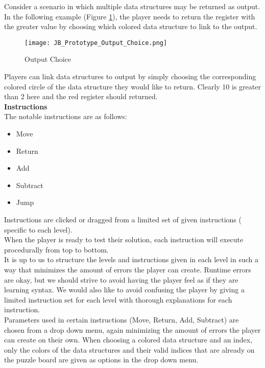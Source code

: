 Consider a scenario in which multiple data structures may be returned as output.
In the following example (Figure \ref{fig:Output_Choice}), the player needs to return the register
with the greater value by choosing which colored data structure to link to the output.

\begin{figure}[!hb]
  \caption{Output Choice}
  \label{fig:Output_Choice}
  \centering
  \texttt{[image: JB\_Prototype\_Output\_Choice.png]}
\end{figure}

Players can link data structures to output by simply choosing the corresponding colored
circle of the data structure they would like to return. Clearly 10 is greater than 2 here and
the red register should returned.\\

\textbf{Instructions}\\

The notable instructions are as follows:

\begin{itemize}
  \item Move
  \item Return
  \item Add
  \item Subtract
  \item Jump
\end{itemize}

Instructions are clicked or dragged from a limited set of given instructions (
specific to each level).\\

When the player is ready to test their solution, each instruction will execute
procedurally from top to bottom.\\

It is up to us to structure the levels and instructions given in each level in such
a way that minimizes the amount of errors the player can create. Runtime errors
are okay, but we should strive to avoid having the player feel as if they are learning
syntax. We would also like to avoid confusing the player by giving a limited
instruction set for each level with thorough explanations for each instruction.\\

Parameters used in certain instructions (Move, Return, Add, Subtract) are chosen
from a drop down menu, again minimizing the amount of errors the player can create
on their own. When choosing a colored data structure and an index, only the colors of
the data structures and their valid indices that are already on the puzzle board
are given as options in the drop down menu.\\
\newpage

